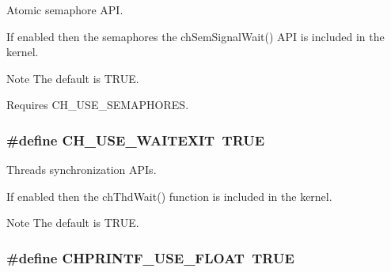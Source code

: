 Atomic semaphore A\+P\+I. 

If enabled then the semaphores the {\ttfamily ch\+Sem\+Signal\+Wait()} A\+P\+I is included in the kernel.

\begin{DoxyNote}{Note}
The default is {\ttfamily T\+R\+U\+E}. 

Requires {\ttfamily C\+H\+\_\+\+U\+S\+E\+\_\+\+S\+E\+M\+A\+P\+H\+O\+R\+E\+S}. 
\end{DoxyNote}
\hypertarget{group__config_gac5e6308f66b8fdb57f0c849ed22b3d95}{}
\subsubsection[{C\+H\+\_\+\+U\+S\+E\+\_\+\+W\+A\+I\+T\+E\+X\+I\+T}]{\setlength{\rightskip}{0pt plus 5cm}\#define C\+H\+\_\+\+U\+S\+E\+\_\+\+W\+A\+I\+T\+E\+X\+I\+T~T\+R\+U\+E}\label{group__config_gac5e6308f66b8fdb57f0c849ed22b3d95}


Threads synchronization A\+P\+Is. 

If enabled then the {\ttfamily ch\+Thd\+Wait()} function is included in the kernel.

\begin{DoxyNote}{Note}
The default is {\ttfamily T\+R\+U\+E}. 
\end{DoxyNote}
\hypertarget{group__config_ga92e0819075bd91dc380cc86a20186960}{}
\subsubsection[{C\+H\+P\+R\+I\+N\+T\+F\+\_\+\+U\+S\+E\+\_\+\+F\+L\+O\+A\+T}]{\setlength{\rightskip}{0pt plus 5cm}\#define C\+H\+P\+R\+I\+N\+T\+F\+\_\+\+U\+S\+E\+\_\+\+F\+L\+O\+A\+T~T\+R\+U\+E}\label{group__config_ga92e0819075bd91dc380cc86a20186960}
\hypertarget{group__config_ga4b0ac77530f0e572b47fb57a00665d1c}{}

